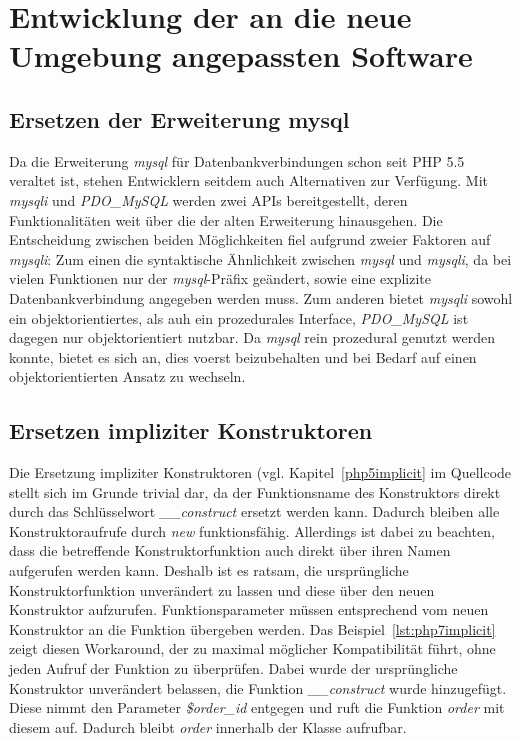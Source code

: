 \section{Entwicklung der an die neue Umgebung angepassten Software}\label{develop}

    \subsection{Ersetzen der Erweiterung mysql}\label{mysql}
    Da die Erweiterung \textit{mysql} für Datenbankverbindungen schon seit \ac{PHP} 5.5 veraltet ist, stehen Entwicklern seitdem auch Alternativen zur Verfügung. Mit \textit{mysqli} und 
    \textit{PDO\_MySQL} werden zwei \acp{API} bereitgestellt, deren Funktionalitäten weit über die der alten Erweiterung hinausgehen. Die Entscheidung zwischen 
    beiden Möglichkeiten fiel aufgrund zweier Faktoren auf \textit{mysqli}: Zum einen die syntaktische Ähnlichkeit zwischen \textit{mysql} und \textit{mysqli}, 
    da bei vielen Funktionen nur der \textit{mysql}-Präfix geändert, sowie eine explizite Datenbankverbindung angegeben werden muss. Zum anderen bietet \textit{mysqli} 
    sowohl ein objektorientiertes, als auh ein prozedurales Interface, \textit{PDO\_MySQL} ist dagegen nur objektorientiert nutzbar. Da \textit{mysql} rein 
    prozedural genutzt werden konnte, bietet es sich an, dies voerst beizubehalten und bei Bedarf auf einen objektorientierten Ansatz zu wechseln.

    \subsection{Ersetzen impliziter Konstruktoren}\label{construct}
    Die Ersetzung impliziter Konstruktoren (vgl. Kapitel~\ref{php5implicit} im Quellcode stellt sich im Grunde trivial dar, da der 
    Funktionsname des Konstruktors direkt durch das Schlüsselwort \textit{\_\_construct} ersetzt werden kann. 
    Dadurch bleiben alle Konstruktoraufrufe durch \textit{new} funktionsfähig. Allerdings 
    ist dabei zu beachten, dass die betreffende Konstruktorfunktion auch direkt über ihren Namen aufgerufen werden kann.
    Deshalb ist es ratsam, die ursprüngliche Konstruktorfunktion unverändert zu lassen und diese über den neuen 
    Konstruktor aufzurufen. Funktionsparameter müssen entsprechend vom neuen Konstruktor an die Funktion übergeben werden. 
    Das Beispiel~\ref{lst:php7implicit} zeigt diesen Workaround, der zu maximal möglicher Kompatibilität führt, 
    ohne jeden Aufruf der Funktion zu überprüfen. Dabei 
    wurde der ursprüngliche Konstruktor unverändert belassen, die Funktion \textit{\_\_construct} wurde hinzugefügt. Diese 
    nimmt den Parameter \textit{\$order\_id} entgegen und ruft die Funktion \textit{order} mit diesem auf. Dadurch 
    bleibt \textit{order} innerhalb der Klasse aufrufbar.

